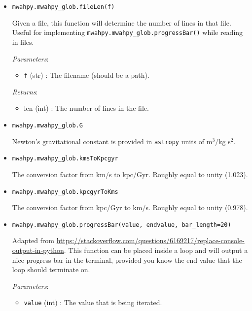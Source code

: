 \documentclass{article}
\begin{document}
\begin{itemize}

\item \verb!mwahpy.mwahpy_glob.fileLen(f)!

Given a file, this function will determine the number of lines in that file. Useful for implementing \verb!mwahpy.mwahpy_glob.progressBar()! while reading in files. 

\textit{Parameters}: \begin{itemize}

\item \verb!f! (str) : The filename (should be a path).

\end{itemize}

\textit{Returns}: \begin{itemize} 

\item len (int) : The number of lines in the file. 

\end{itemize}




\item \verb!mwahpy.mwahpy_glob.G!

Newton's gravitational constant is provided in \verb!astropy! units of m$^3$/kg s$^2$.

\item \verb!mwahpy.mwahpy_glob.kmsToKpcgyr!

The conversion factor from km/s to kpc/Gyr. Roughly equal to unity (1.023).

\item \verb!mwahpy.mwahpy_glob.kpcgyrToKms!

The conversion factor from kpc/Gyr to km/s. Roughly equal to unity (0.978).



\item \verb!mwahpy.mwahpy_glob.progressBar(value, endvalue, bar_length=20)!

Adapted from \url{https://stackoverflow.com/questions/6169217/replace-console-output-in-python}. This function can be placed inside a loop and will output a nice progress bar in the terminal, provided you know the end value that the loop should terminate on. 

\textit{Parameters}: \begin{itemize}

\item \verb!value! (int) : The value that is being iterated.


\end{itemize}
\end{itemize}
\end{document}
